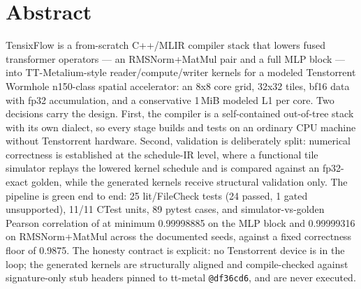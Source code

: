 \section*{Abstract}

TensixFlow is a from-scratch C++/MLIR compiler stack that lowers fused transformer
operators --- an RMSNorm+MatMul pair and a full MLP block --- into TT-Metalium-style
reader/compute/writer kernels for a modeled Tenstorrent Wormhole n150-class spatial
accelerator: an 8x8 core grid, 32x32 tiles, bf16 data with fp32 accumulation, and a
conservative 1\,MiB modeled L1 per core. Two decisions carry the design. First, the
compiler is a self-contained out-of-tree stack with its own dialect, so every stage
builds and tests on an ordinary CPU machine without Tenstorrent hardware. Second,
validation is deliberately split: numerical correctness is established at the
schedule-IR level, where a functional tile simulator replays the lowered kernel
schedule and is compared against an fp32-exact golden, while the generated kernels
receive structural validation only. The pipeline is green end to end: 25
lit/FileCheck tests (24 passed, 1 gated unsupported), 11/11 CTest units, 89 pytest
cases, and simulator-vs-golden Pearson correlation of at minimum 0.99998885 on the
MLP block and 0.99999316 on RMSNorm+MatMul across the documented seeds, against a
fixed correctness floor of 0.9875. The honesty contract is explicit: no Tenstorrent
device is in the loop; the generated kernels are structurally aligned and
compile-checked against signature-only stub headers pinned to tt-metal
\texttt{@df36cd6}, and are never executed.
